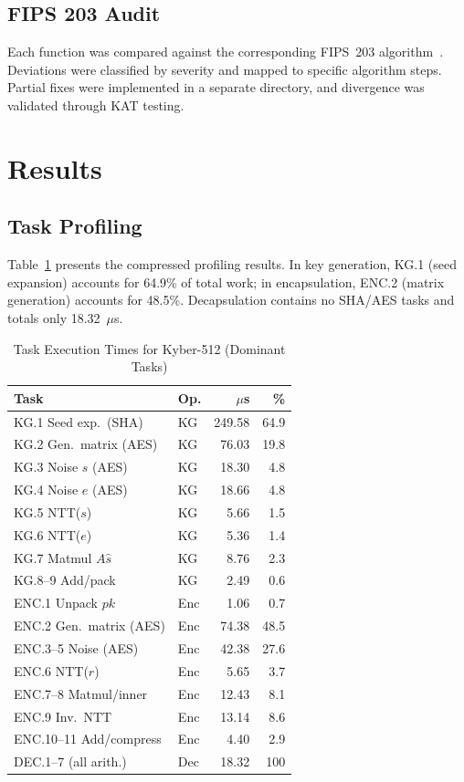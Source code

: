 \documentclass[conference]{IEEEtran}
\begin{document}
\subsection{FIPS 203 Audit}

Each function was compared against the corresponding FIPS~203 algorithm~\cite{fips203}. Deviations were classified by severity and mapped to specific algorithm steps. Partial fixes were implemented in a separate directory, and divergence was validated through KAT testing.

\section{Results}

\subsection{Task Profiling}

Table~\ref{tab:profiling} presents the compressed profiling results. In key generation, KG.1 (seed expansion) accounts for 64.9\% of total work; in encapsulation, ENC.2 (matrix generation) accounts for 48.5\%. Decapsulation contains no SHA/AES tasks and totals only 18.32~$\mu$s.

\begin{table}[!t]
\renewcommand{\arraystretch}{1.1}
\caption{Task Execution Times for Kyber-512 (Dominant Tasks)}
\label{tab:profiling}
\centering
\begin{tabular}{p{3.8cm} l r r}
\toprule
\textbf{Task} & \textbf{Op.} & \textbf{$\mu$s} & \textbf{\%} \\
\midrule
KG.1 Seed exp.\ (SHA) & KG & 249.58 & 64.9 \\
KG.2 Gen.\ matrix (AES) & KG & 76.03 & 19.8 \\
KG.3 Noise $s$ (AES) & KG & 18.30 & 4.8 \\
KG.4 Noise $e$ (AES) & KG & 18.66 & 4.8 \\
KG.5 NTT($s$) & KG & 5.66 & 1.5 \\
KG.6 NTT($e$) & KG & 5.36 & 1.4 \\
KG.7 Matmul $A\hat{s}$ & KG & 8.76 & 2.3 \\
KG.8--9 Add/pack & KG & 2.49 & 0.6 \\
\midrule
ENC.1 Unpack $pk$ & Enc & 1.06 & 0.7 \\
ENC.2 Gen.\ matrix (AES) & Enc & 74.38 & 48.5 \\
ENC.3--5 Noise (AES) & Enc & 42.38 & 27.6 \\
ENC.6 NTT($r$) & Enc & 5.65 & 3.7 \\
ENC.7--8 Matmul/inner & Enc & 12.43 & 8.1 \\
ENC.9 Inv.\ NTT & Enc & 13.14 & 8.6 \\
ENC.10--11 Add/compress & Enc & 4.40 & 2.9 \\
\midrule
DEC.1--7 (all arith.) & Dec & 18.32 & 100 \\
\bottomrule
\end{tabular}
\end{table}
\end{document}
